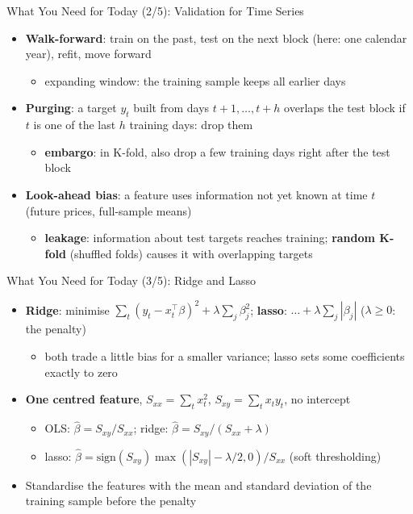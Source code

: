 \begin{frame}{What You Need for Today (2/5): Validation for Time Series}
\itemsize{\small}
\begin{itemize}
    \item \textbf{Walk-forward}: train on the past, test on the next block (here: one calendar year), refit, move forward
    \begin{itemize}
        \item expanding window: the training sample keeps all earlier days
    \end{itemize}
    \item \textbf{Purging}: a target $y_t$ built from days $t+1, \dots, t+h$ overlaps the test block if $t$ is one of the last $h$ training days: drop them
    \begin{itemize}
        \item \textbf{embargo}: in K-fold, also drop a few training days right after the test block
    \end{itemize}
    \item \textbf{Look-ahead bias}: a feature uses information not yet known at time $t$ (future prices, full-sample means)
    \begin{itemize}
        \item \textbf{leakage}: information about test targets reaches training; \textbf{random K-fold} (shuffled folds) causes it with overlapping targets
    \end{itemize}
\end{itemize}
\end{frame}

\begin{frame}{What You Need for Today (3/5): Ridge and Lasso}
\itemsize{\small}
\begin{itemize}
    \item \textbf{Ridge}: minimise $\sum_t (y_t - x_t^\top\beta)^2 + \lambda\sum_j \beta_j^2$; \textbf{lasso}: $\dots + \lambda\sum_j |\beta_j|$ ($\lambda \ge 0$: the penalty)
    \begin{itemize}
        \item both trade a little bias for a smaller variance; lasso sets some coefficients exactly to zero
    \end{itemize}
    \item \textbf{One centred feature}, $S_{xx} = \sum_t x_t^2$, $S_{xy} = \sum_t x_ty_t$, no intercept
    \begin{itemize}
        \item OLS: $\hat\beta = S_{xy}/S_{xx}$; ridge: $\hat\beta = S_{xy}/(S_{xx} + \lambda)$
        \item lasso: $\hat\beta = \mathrm{sign}(S_{xy})\max(|S_{xy}| - \lambda/2, 0)/S_{xx}$ (soft thresholding)
    \end{itemize}
    \item Standardise the features with the mean and standard deviation of the training sample before the penalty
\end{itemize}
\end{frame}

